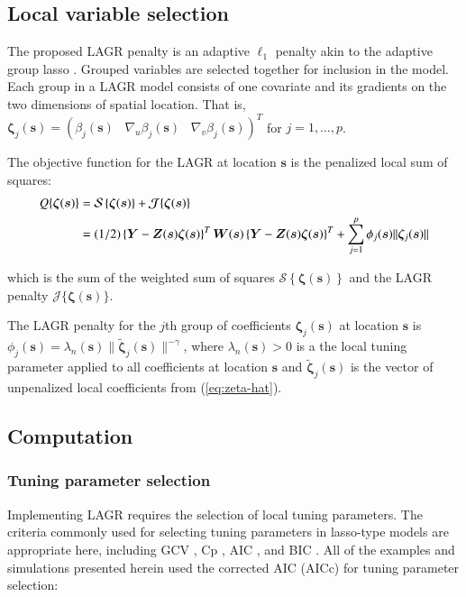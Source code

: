 \documentclass[authoryear, review, 11pt]{elsarticle}
\begin{document}
	\subsection{Local variable selection}
	The proposed LAGR penalty is an adaptive $\ell_1$ penalty akin to the adaptive group lasso \citep{Wang-Leng-2008,Zou:2006}. Grouped variables are selected together for inclusion in the model. Each group in a LAGR model consists of one covariate and its gradients on the two dimensions of spatial location. That is, $\bm{\zeta}_j(\bm{s}) = \left( \beta_j(\bm{s}) \;\;\; \nabla_u \beta_j(\bm{s}) \;\;\; \nabla_v \beta_j(\bm{s}) \right)^T$ for $j=1, \dots, p$.
	
	The objective function for the LAGR at location $\bm{s}$ is the penalized local sum of squares:
	\begin{align}\label{eq:adaptive-lasso-WLS}
		Q \{ \bm{\zeta}(\bm{s}) \} &= \mathcal{S} \left\{ \bm{\zeta}( \bm{s} ) \right\} + \mathcal{J}\{ \bm{\zeta}(\bm{s}) \} \notag \\
		&= (1/2) \left\{ \bm{Y} - \bm{Z}(\bm{s}) \bm{\zeta} (\bm{s}) \right\}^T \bm{W}(\bm{s}) \left\{ \bm{Y} - \bm{Z}(\bm{s}) \bm{\zeta} (\bm{s}) \right\}^T + \sum_{j=1}^p \phi_j(\bm{s}) \| \bm{\zeta}_j(\bm{s}) \| 
	\end{align}
	
	which is the sum of the weighted sum of squares $\mathcal{S} \left\{ \bm{\zeta}( \bm{s} ) \right\}$ and the LAGR penalty $\mathcal{J}\{ \bm{\zeta}(\bm{s}) \}$.

    The LAGR penalty for the $j$th group of coefficients $\bm{\zeta}_j(\bm{s})$ at location $\bm{s}$ is $\phi_j(\bm{s}) = \lambda_n (\bm{s}) \| \tilde{\bm{\zeta}}_j(\bm{s}) \|^{-\gamma}$, where $\lambda_n (\bm{s}) > 0$ is a the local tuning parameter applied to all coefficients at location $\bm{s}$ and $\tilde{\bm{\zeta}}_j (\bm{s})$ is the vector of unpenalized local coefficients from (\ref{eq:zeta-hat}).


    \subsection{Computation}
        \subsubsection{Tuning parameter selection}
        Implementing LAGR requires the selection of local tuning parameters. The criteria commonly used for selecting tuning parameters in lasso-type models are appropriate here, including GCV \citep{Wahba:1990}, Cp \citep{Mallows-1973}, AIC \citep{Akaike-1973}, and BIC \citep{Schwarz-1978}. All of the examples and simulations presented herein used the corrected AIC (AICc) \citep{Hurvich-1998} for tuning parameter selection:
\end{document}
